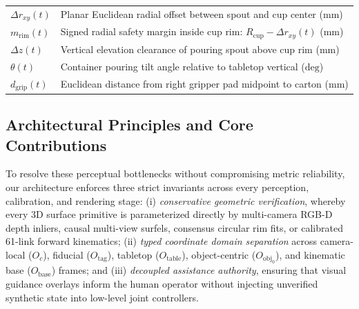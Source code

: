 \documentclass[10pt,journal]{IEEEtran}
\begin{document}
\begin{table}[t]
\begin{tabular}{@{}lp{6.3cm}@{}}
        $\Delta r_{xy}(t)$ & Planar Euclidean radial offset between spout and cup center ($\mathrm{mm}$) \\
        $m_{\mathrm{rim}}(t)$ & Signed radial safety margin inside cup rim: $R_{\mathrm{cup}} - \Delta r_{xy}(t)$ ($\mathrm{mm}$) \\
        $\Delta z(t)$ & Vertical elevation clearance of pouring spout above cup rim ($\mathrm{mm}$) \\
        $\theta(t)$ & Container pouring tilt angle relative to tabletop vertical ($\mathrm{deg}$) \\
        $d_{\mathrm{grip}}(t)$ & Euclidean distance from right gripper pad midpoint to carton ($\mathrm{mm}$) \\
        \bottomrule
    \end{tabular}
\end{table}

\subsection{Architectural Principles and Core Contributions}
To resolve these perceptual bottlenecks without compromising metric reliability, our architecture enforces three strict invariants across every perception, calibration, and rendering stage: (i) \emph{conservative geometric verification}, whereby every 3D surface primitive is parameterized directly by multi-camera RGB-D depth inliers, causal multi-view surfels, consensus circular rim fits, or calibrated 61-link forward kinematics; (ii) \emph{typed coordinate domain separation} across camera-local ($O_c$), fiducial ($O_{\mathrm{tag}}$), tabletop ($O_{\mathrm{table}}$), object-centric ($O_{\mathrm{obj}_0}$), and kinematic base ($O_{\mathrm{base}}$) frames; and (iii) \emph{decoupled assistance authority}, ensuring that visual guidance overlays inform the human operator without injecting unverified synthetic state into low-level joint controllers.
\end{document}
